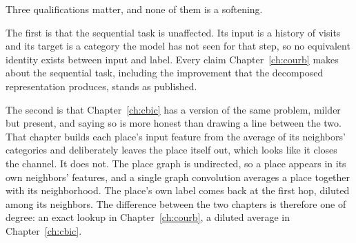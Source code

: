 Three qualifications matter, and none of them is a softening.

The first is that the sequential task is unaffected. Its input is a history of visits and
its target is a category the model has not seen for that step, so no equivalent identity
exists between input and label. Every claim Chapter~\ref{ch:courb} makes about the
sequential task, including the improvement that the decomposed representation produces,
stands as published.

The second is that Chapter~\ref{ch:cbic} has a version of the same problem, milder but present, and
saying so is more honest than drawing a line between the two. That chapter builds each place's input
feature from the average of its neighbors' categories and deliberately leaves the place itself out,
which looks like it closes the channel. It does not. The place graph is undirected, so a place
appears in its own neighbors' features, and a single graph convolution averages a place together
with its neighborhood. The place's own label comes back at the first hop, diluted among its
neighbors. The difference between the two chapters is therefore one of degree: an exact lookup in
Chapter~\ref{ch:courb}, a diluted average in Chapter~\ref{ch:cbic}.

